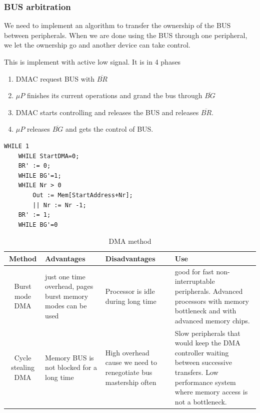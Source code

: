 \documentclass{report}
\begin{document}
\subsubsection{BUS arbitration}

We need to implement an algorithm to transfer the ownership of the BUS between peripherals. When we are done using the BUS through one peripheral, we let the ownership go and another device can take control.

This is implement with active low signal. It is in 4 phases

\begin{enumerate}
    \item DMAC request BUS with $\overline{BR}$
    \item $\mu P$ finishes its current operations and grand the bus through $\overline{BG}$
    \item DMAC starts controlling and releases the BUS and releases $\overline{BR}$.
    \item $\mu P$ releases $\overline{BG}$ and gets the control of BUS.
\end{enumerate}

\begin{lstlisting}
WHILE 1
    WHILE StartDMA=0;
    BR' := 0;
    WHILE BG'=1;
    WHILE Nr > 0
        Out := Mem[StartAddress+Nr];
        || Nr := Nr -1;
    BR' := 1;
    WHILE BG'=0
\end{lstlisting}

\begin{table}[H]
    \centering
    \begin{tabular}{|c|p{}|p{}|p{}|}
         \hline 
        Method & Advantages & Disadvantages & Use\\
        \hline
        Burst mode DMA & just one time overhead, pages burst memory modes can be used & Processor is idle during long time & good for fast non-interruptable peripherals. Advanced processors with memory bottleneck and with advanced memory chips. \\
        \hline 
        Cycle stealing DMA & Memory BUS is not blocked for a long time & High overhead cause we need to renegotiate bus mastership often & Slow peripherals that would keep the DMA controller waiting between successive transfers. Low performance system where memory access is not a bottleneck.\\
        \hline
    \end{tabular}
    \caption{DMA method}
    \label{tab:my_label}
\end{table}
\end{document}
